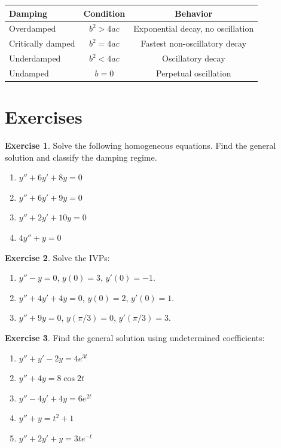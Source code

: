 \documentclass[12pt,a4paper,openany]{book}
\theoremstyle{definition}
\newtheorem{exercise}{Exercise}[chapter]
\theoremstyle{plain}
\theoremstyle{remark}
\begin{document}
\begin{center}
\renewcommand{\arraystretch}{1.5}
\begin{tabular}{lcc}
\toprule
\textbf{Damping} & \textbf{Condition} & \textbf{Behavior} \\
\midrule
Overdamped & $b^2 > 4ac$ & Exponential decay, no oscillation \\
Critically damped & $b^2 = 4ac$ & Fastest non-oscillatory decay \\
Underdamped & $b^2 < 4ac$ & Oscillatory decay \\
Undamped & $b = 0$ & Perpetual oscillation \\
\bottomrule
\end{tabular}
\label{tab:damping}
\end{center}

\section{Exercises}\label{sec:ch4-exercises}

\begin{exercise}\label{exer:homo-solve}
Solve the following homogeneous equations. Find the general solution and classify
the damping regime.
\begin{enumerate}[label=(\alph*)]
  \item $y'' + 6y' + 8y = 0$
  \item $y'' + 6y' + 9y = 0$
  \item $y'' + 2y' + 10y = 0$
  \item $4y'' + y = 0$
\end{enumerate}
\end{exercise}

\begin{exercise}\label{exer:ivp-homo}
Solve the IVPs:
\begin{enumerate}[label=(\alph*)]
  \item $y'' - y = 0$, $y(0) = 3$, $y'(0) = -1$.
  \item $y'' + 4y' + 4y = 0$, $y(0) = 2$, $y'(0) = 1$.
  \item $y'' + 9y = 0$, $y(\pi/3) = 0$, $y'(\pi/3) = 3$.
\end{enumerate}
\end{exercise}

\begin{exercise}\label{exer:undetermined}
Find the general solution using undetermined coefficients:
\begin{enumerate}[label=(\alph*)]
  \item $y'' + y' - 2y = 4e^{3t}$
  \item $y'' + 4y = 8\cos 2t$
  \item $y'' - 4y' + 4y = 6e^{2t}$
  \item $y'' + y = t^2 + 1$
  \item $y'' + 2y' + y = 3te^{-t}$
\end{enumerate}
\end{exercise}
\end{document}

